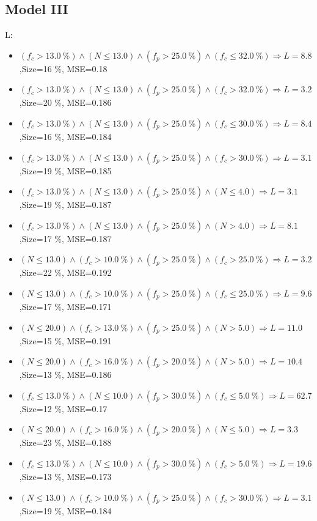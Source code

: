 \documentclass[numbered]{CSL}
\begin{document}
\subsection{Model III}
L:
\begin{itemize}
\item $(f_c > 13.0~\%) \land (N \leq 13.0) \land (f_p > 25.0~\%) \land (f_c \leq 32.0~\%) \Rightarrow L = 8.8$,\hfill Size=16 \%, MSE=0.18
\item $(f_c > 13.0~\%) \land (N \leq 13.0) \land (f_p > 25.0~\%) \land (f_c > 32.0~\%) \Rightarrow L = 3.2$,\hfill Size=20 \%, MSE=0.186
\item $(f_c > 13.0~\%) \land (N \leq 13.0) \land (f_p > 25.0~\%) \land (f_c \leq 30.0~\%) \Rightarrow L = 8.4$,\hfill Size=16 \%, MSE=0.184
\item $(f_c > 13.0~\%) \land (N \leq 13.0) \land (f_p > 25.0~\%) \land (f_c > 30.0~\%) \Rightarrow L = 3.1$,\hfill Size=19 \%, MSE=0.185
\item $(f_c > 13.0~\%) \land (N \leq 13.0) \land (f_p > 25.0~\%) \land (N \leq 4.0) \Rightarrow L = 3.1$,\hfill Size=19 \%, MSE=0.187
\item $(f_c > 13.0~\%) \land (N \leq 13.0) \land (f_p > 25.0~\%) \land (N > 4.0) \Rightarrow L = 8.1$,\hfill Size=17 \%, MSE=0.187
\item $(N \leq 13.0) \land (f_c > 10.0~\%) \land (f_p > 25.0~\%) \land (f_c > 25.0~\%) \Rightarrow L = 3.2$,\hfill Size=22 \%, MSE=0.192
\item $(N \leq 13.0) \land (f_c > 10.0~\%) \land (f_p > 25.0~\%) \land (f_c \leq 25.0~\%) \Rightarrow L = 9.6$,\hfill Size=17 \%, MSE=0.171
\item $(N \leq 20.0) \land (f_c > 13.0~\%) \land (f_p > 25.0~\%) \land (N > 5.0) \Rightarrow L = 11.0$,\hfill Size=15 \%, MSE=0.191
\item $(N \leq 20.0) \land (f_c > 16.0~\%) \land (f_p > 20.0~\%) \land (N > 5.0) \Rightarrow L = 10.4$,\hfill Size=13 \%, MSE=0.186
\item $(f_c \leq 13.0~\%) \land (N \leq 10.0) \land (f_p > 30.0~\%) \land (f_c \leq 5.0~\%) \Rightarrow L = 62.7$,\hfill Size=12 \%, MSE=0.17
\item $(N \leq 20.0) \land (f_c > 16.0~\%) \land (f_p > 20.0~\%) \land (N \leq 5.0) \Rightarrow L = 3.3$,\hfill Size=23 \%, MSE=0.188
\item $(f_c \leq 13.0~\%) \land (N \leq 10.0) \land (f_p > 30.0~\%) \land (f_c > 5.0~\%) \Rightarrow L = 19.6$,\hfill Size=13 \%, MSE=0.173
\item $(N \leq 13.0) \land (f_c > 10.0~\%) \land (f_p > 25.0~\%) \land (f_c > 30.0~\%) \Rightarrow L = 3.1$,\hfill Size=19 \%, MSE=0.184

\end{itemize}
\end{document}
